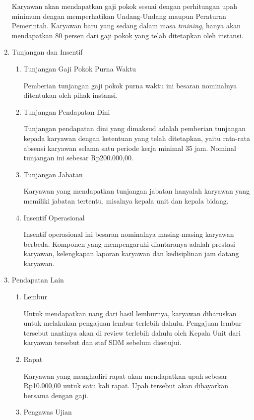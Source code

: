 \begin{enumerate}
					Karyawan akan mendapatkan gaji pokok sesuai dengan perhitungan upah minimum dengan memperhatikan Undang-Undang maupun Peraturan Pemerintah. Karyawan baru yang sedang dalam masa \emph{training}, hanya akan mendapatkan 80 persen dari gaji pokok yang telah ditetapkan oleh instansi.
					\item Tunjangan dan Insentif
						\begin{enumerate}[label=\alph*.]
							\itemsep0em
							\item Tunjangan Gaji Pokok Purna Waktu
							
							Pemberian tunjangan gaji pokok purna waktu ini besaran nominalnya ditentukan oleh pihak instansi.
							\item Tunjangan Pendapatan Dini
							
							Tunjangan pendapatan dini yang dimaksud adalah pemberian tunjangan kepada karyawan dengan ketentuan yang telah ditetapkan, yaitu rata-rata absensi karyawan selama satu periode kerja minimal 35 jam. Nominal tunjangan ini sebesar Rp200.000,00.\newline
							\item Tunjangan Jabatan
							
							Karyawan yang mendapatkan tunjangan jabatan hanyalah karyawan yang memiliki jabatan tertentu, misalnya kepala unit dan kepala bidang.
							\item Insentif Operasional
							
							Insentif operasional ini besaran nominalnya masing-masing karyawan berbeda. Komponen yang mempengaruhi diantaranya adalah prestasi karyawan, kelengkapan laporan karyawan dan kedisiplinan jam datang karyawan. 
						\end{enumerate}

					\item Pendapatan Lain
						\begin{enumerate}[label=\alph*.]
							\itemsep0em
							\item Lembur
							
							Untuk mendapatkan uang dari hasil lemburnya, karyawan diharuskan untuk melakukan pengajuan lembur terlebih dahulu. Pengajuan lembur tersebut nantinya akan di review terlebih dahulu oleh Kepala Unit dari karyawan tersebut dan staf SDM sebelum disetujui.
							\item Rapat
							
							Karyawan yang menghadiri rapat akan mendapatkan upah sebesar Rp10.000,00 untuk satu kali rapat. Upah tersebut akan dibayarkan bersama dengan gaji.
							\item Pengawas Ujian
							

\end{enumerate}
\end{enumerate}
